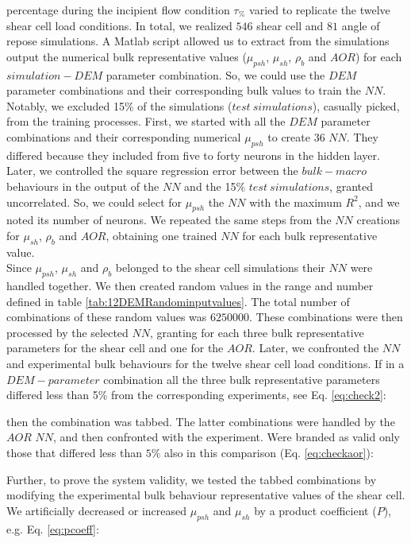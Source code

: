 percentage during the incipient flow condition $\tau_{\%}$
varied to replicate the twelve shear cell load conditions. 
In total, we realized $546$ shear cell and $81$ angle of repose simulations.
A Matlab script allowed us to extract from the simulations output the numerical
bulk representative values ($\mu_{psh}$, $\mu_{sh}$, $\rho_b$ and $AOR$) for each $simulation-DEM$ parameter combination. 
So, we could use the $DEM$ parameter combinations and their corresponding bulk values to train the $NN$. 
Notably, we excluded 15\% of the simulations ($test ~ simulations$), casually
picked, from the training processes.
First, we started with all the $DEM$ parameter combinations and their corresponding numerical $\mu_{psh}$ to create 36 $NN$. 
They differed because they included from five to forty neurons in the hidden
layer.
Later, we controlled the square regression error between the $bulk-macro$ behaviours in the output of 
the $NN$ and the 15\% $test ~ simulations$, granted uncorrelated. 
So, we could select for $\mu_{psh}$ the $NN$ with the maximum $R^2$, and we noted its number of neurons. 
We repeated the same steps from the $NN$ creations for $\mu_{sh}$, $\rho_b$ and $AOR$, 
obtaining one trained $NN$ for each bulk representative value. \\
% 
Since $\mu_{psh}$, $\mu_{sh}$ and $\rho_b$ belonged to the shear cell
simulations their $NN$ were handled together. We then created random values in the range
and number defined in table \ref{tab:12DEMRandominputvalues}.
The total number of combinations of these random values was $6250000$. These
combinations were then processed by the selected $NN$, granting for each three bulk representative parameters for the shear cell and one for the $AOR$. Later, we confronted the $NN$ and experimental bulk behaviours for the twelve shear cell load conditions. 
If in a $DEM-parameter$ combination all the three bulk representative parameters differed less 
than 5\% from the corresponding experiments, see Eq. \ref{eq:check2}:

then the combination was tabbed. The latter combinations were handled by the $AOR$ $NN$, and then confronted with the experiment. 
Were branded as valid only those that differed less than $5\%$ also in this
comparison (Eq. \ref{eq:checkaor}):

Further, to prove the system validity, we tested the tabbed combinations by modifying the experimental bulk
behaviour representative values of the shear cell. 
We artificially decreased or increased $\mu_{psh}$ and $\mu_{sh}$ by a product
coefficient ($P$), e.g. Eq. \ref{eq:pcoeff}:





%
